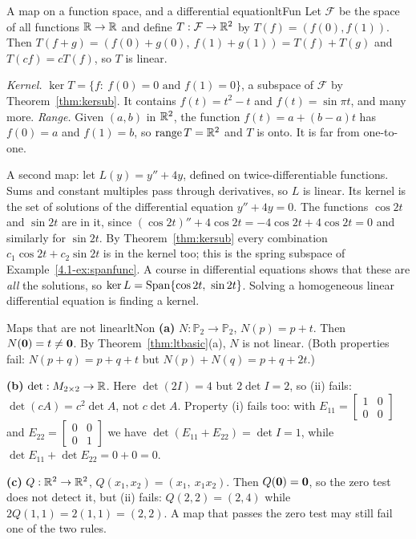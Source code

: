 \documentclass[11pt]{article}
\begin{document}
\begin{exmp}{A map on a function space, and a differential equation}{ltFun}
Let $\mathcal{F}$ be the space of all functions $\mathbb{R}\to\mathbb{R}$ and define $T:\mathcal{F}\to\mathbb{R}^2$ by $T(f)=(f(0),f(1))$. Then $T(f+g)=(f(0)+g(0),\ f(1)+g(1))=T(f)+T(g)$ and $T(cf)=cT(f)$, so $T$ is linear.

\emph{Kernel.} $\ker T=\{f:\ f(0)=0\text{ and }f(1)=0\}$, a subspace of $\mathcal{F}$ by Theorem~\ref{thm:kersub}. It contains $f(t)=t^2-t$ and $f(t)=\sin\pi t$, and many more. \emph{Range.} Given $(a,b)$ in $\mathbb{R}^2$, the function $f(t)=a+(b-a)t$ has $f(0)=a$ and $f(1)=b$, so $\operatorname{range}T=\mathbb{R}^2$ and $T$ is onto. It is far from one-to-one.

A second map: let $L(y)=y''+4y$, defined on twice-differentiable functions. Sums and constant multiples pass through derivatives, so $L$ is linear. Its kernel is the set of solutions of the differential equation $y''+4y=0$. The functions $\cos2t$ and $\sin2t$ are in it, since $(\cos2t)''+4\cos2t=-4\cos2t+4\cos2t=0$ and similarly for $\sin2t$. By Theorem~\ref{thm:kersub} every combination $c_1\cos2t+c_2\sin2t$ is in the kernel too; this is the spring subspace of Example~\ref{4.1-ex:spanfunc}. A course in differential equations shows that these are \emph{all} the solutions, so $\ker L=\operatorname{Span}\{\cos2t,\ \sin2t\}$. Solving a homogeneous linear differential equation is finding a kernel.
\end{exmp}

\begin{exmp}{Maps that are not linear}{ltNon}
\textbf{(a)} $N:\mathbb{P}_2\to\mathbb{P}_2$, $N(p)=p+t$. Then $N(\mathbf{0})=t\neq\mathbf{0}$. By Theorem~\ref{thm:ltbasic}(a), $N$ is not linear. (Both properties fail: $N(p+q)=p+q+t$ but $N(p)+N(q)=p+q+2t$.)

\textbf{(b)} $\det:M_{2\times2}\to\mathbb{R}$. Here $\det(2I)=4$ but $2\det I=2$, so (ii) fails: $\det(cA)=c^2\det A$, not $c\det A$. Property (i) fails too: with $E_{11}=\begin{bmatrix}1&0\\0&0\end{bmatrix}$ and $E_{22}=\begin{bmatrix}0&0\\0&1\end{bmatrix}$ we have $\det(E_{11}+E_{22})=\det I=1$, while $\det E_{11}+\det E_{22}=0+0=0$.

\textbf{(c)} $Q:\mathbb{R}^2\to\mathbb{R}^2$, $Q(x_1,x_2)=(x_1,\ x_1x_2)$. Then $Q(\mathbf{0})=\mathbf{0}$, so the zero test does not detect it, but (ii) fails: $Q(2,2)=(2,4)$ while $2Q(1,1)=2(1,1)=(2,2)$. A map that passes the zero test may still fail one of the two rules.
\end{exmp}
\end{document}
